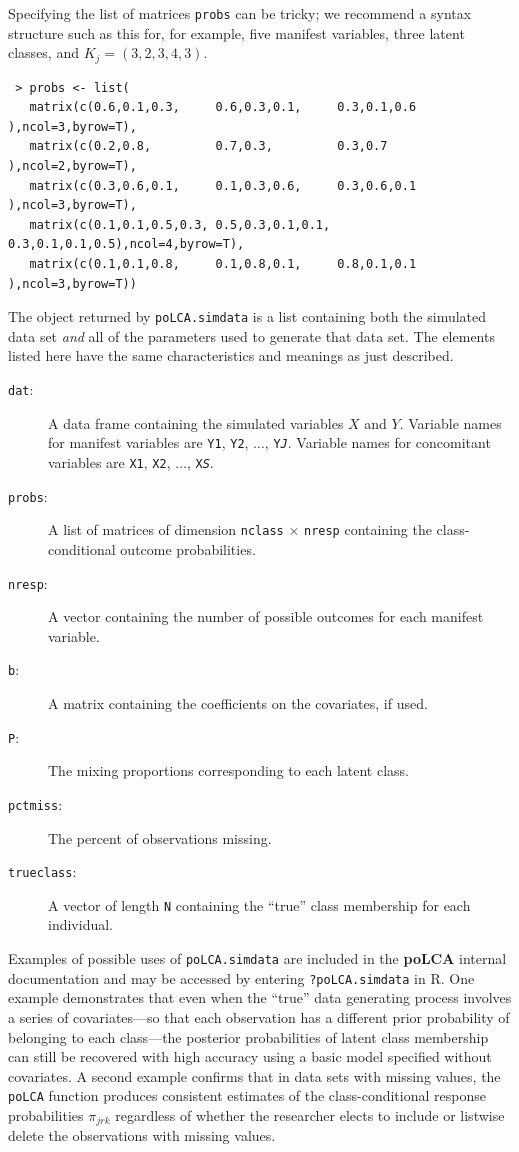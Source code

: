 \documentclass[letterpaper,12pt]{article}
\begin{document}
Specifying the list of matrices \texttt{probs} can be tricky; we recommend a syntax structure such as this for, for example, five manifest variables, three latent classes, and $K_j=(3,2,3,4,3)$.
\begin{verbatim}
 > probs <- list(
   matrix(c(0.6,0.1,0.3,     0.6,0.3,0.1,     0.3,0.1,0.6    ),ncol=3,byrow=T),
   matrix(c(0.2,0.8,         0.7,0.3,         0.3,0.7        ),ncol=2,byrow=T),
   matrix(c(0.3,0.6,0.1,     0.1,0.3,0.6,     0.3,0.6,0.1    ),ncol=3,byrow=T),
   matrix(c(0.1,0.1,0.5,0.3, 0.5,0.3,0.1,0.1, 0.3,0.1,0.1,0.5),ncol=4,byrow=T),
   matrix(c(0.1,0.1,0.8,     0.1,0.8,0.1,     0.8,0.1,0.1    ),ncol=3,byrow=T))
\end{verbatim}
The object returned by \texttt{poLCA.simdata} is a list containing both the simulated data set \emph{and} all of the parameters used to generate that data set.  The elements listed here have the same characteristics and meanings as just described.
\begin{description}
    \item [\texttt{dat}:] A data frame containing the simulated variables $X$ and $Y$. Variable names for manifest variables are \texttt{Y1}, \texttt{Y2}, $\ldots$, \texttt{Y\emph{J}}. Variable names for concomitant variables are \texttt{X1}, \texttt{X2}, $\ldots$, \texttt{X\emph{S}}.
    \item [\texttt{probs}:] A list of matrices of dimension \texttt{nclass} $\times$ \texttt{nresp} containing the class-conditional outcome probabilities.
    \item [\texttt{nresp}:] A vector containing the number of possible outcomes for each manifest variable.
    \item [\texttt{b}:] A matrix containing the coefficients on the covariates, if used.
    \item [\texttt{P}:] The mixing proportions corresponding to each latent class.
    \item [\texttt{pctmiss}:] The percent of observations missing.
    \item [\texttt{trueclass}:] A vector of length \texttt{N} containing the ``true'' class membership for each individual.
\end{description}

Examples of possible uses of \texttt{poLCA.simdata} are included in the \textbf{poLCA} internal documentation and may be accessed by entering \verb"?poLCA.simdata" in \textsf{R}. One example demonstrates that even when the ``true'' data generating process involves a series of covariates---so that each observation has a different prior probability of belonging to each class---the posterior probabilities of latent class membership can still be recovered with high accuracy using a basic model specified without covariates.  A second example confirms that in data sets with missing values, the \texttt{poLCA} function produces consistent estimates of the class-conditional response probabilities $\pi_{jrk}$ regardless of whether the researcher elects to include or listwise delete the observations with missing values.
\end{document}
